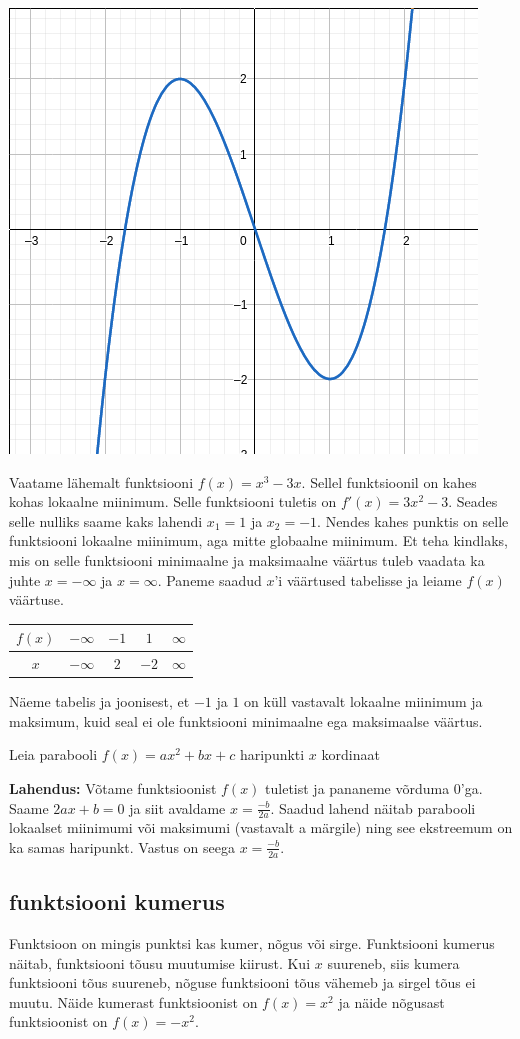 \documentclass[a4paper,11pt,twocolumn]{article}
\begin{document}
\includegraphics[width = .4\textwidth]{joon1.png}

Vaatame lähemalt funktsiooni $f(x)=x^3-3x$. Sellel funktsioonil on kahes kohas lokaalne miinimum. Selle funktsiooni tuletis on $f'(x)=3x^2-3$. Seades selle nulliks saame kaks lahendi $x_1=1$ ja $x_2=-1$. Nendes kahes punktis on selle funktsiooni lokaalne miinimum, aga mitte globaalne miinimum. Et teha kindlaks, mis on selle funktsiooni minimaalne ja maksimaalne väärtus tuleb vaadata ka juhte $x=-\infty$ ja $x=\infty$. Paneme saadud $x$'i väärtused tabelisse ja leiame $f(x)$ väärtuse.
\begin{table}[h]
  \centering
  \begin{tabular}{c | c c c c}
    $f(x)$ & $-\infty$ & $-1$ & $1$ & $\infty$\\
    \hline
    $x$ & $-\infty$ & $2$ & $-2$ & $\infty$    
  \end{tabular}
\end{table}
Näeme tabelis ja joonisest, et $-1$ ja $1$ on küll vastavalt lokaalne miinimum ja maksimum, kuid seal ei ole funktsiooni minimaalne ega maksimaalse väärtus.

\begin{question}
  Leia parabooli $f(x)=ax^2+bx+c$ haripunkti $x$ kordinaat
\end{question}
\textbf{Lahendus:} Võtame funktsioonist $f(x)$ tuletist ja pananeme võrduma $0$'ga. Saame $2ax+b=0$ ja siit avaldame $x=\frac{-b}{2a}$. Saadud lahend näitab parabooli lokaalset miinimumi või maksimumi (vastavalt a märgile) ning see ekstreemum on ka samas haripunkt. Vastus on seega $x=\frac{-b}{2a}$.

\subsection{funktsiooni kumerus}
Funktsioon on mingis punktsi kas kumer, nõgus või sirge. Funktsiooni kumerus näitab, funktsiooni tõusu muutumise kiirust. Kui $x$ suureneb, siis kumera funktsiooni tõus suureneb, nõguse funktsiooni tõus vähemeb ja sirgel tõus ei muutu.  Näide kumerast funktsioonist on $f(x)=x^2$ ja näide nõgusast funktsioonist on $f(x)=-x^2$.
\end{document}
